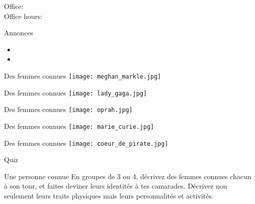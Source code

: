 \documentclass{beamer}
\subtitle[Femmes et questions]{Les femmes et les questions}
\begin{document}
  \begin{frame}
    \titlepage
    \tiny{Office: \\
          Office hours: }
  \end{frame}

  \begin{frame}{Annonces}
    \begin{itemize}
      \item
      \item[] \gloss{}
    \end{itemize}
  \end{frame}

  \begin{frame}{Des femmes connues}
    \texttt{[image: meghan\_markle.jpg]}
  \end{frame}

  \begin{frame}{Des femmes connues}
    \texttt{[image: lady\_gaga.jpg]}
  \end{frame}

  \begin{frame}{Des femmes connues}
    \texttt{[image: oprah.jpg]}
  \end{frame}

  \begin{frame}{Des femmes connues}
    \texttt{[image: marie\_curie.jpg]}
  \end{frame}

  \begin{frame}{Des femmes connues}
    \texttt{[image: coeur\_de\_pirate.jpg]}
  \end{frame}

  \begin{frame}{}
    \begin{center}
      \Large Quiz
    \end{center}
  \end{frame}

  \begin{frame}{Une personne connue}
    En groupes de 3 ou 4, décrivez des femmes connues chacun à son tour, et faites deviner leurs identités à tes camarades. Décrivez non seulement leurs traits physiques mais leurs personnalités et activités. \\
  \end{frame}
\end{document}
